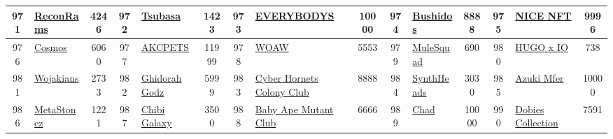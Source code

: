 \begin{table*}[]
{\begin{tabular}{|c|l|c|c|l|c|c|l|c|c|l|c|c|l|c|}
        971   & \href{https://www.reconrams.io/}{ReconRams}                                        & 4246              & 972   & \href{https://www.tabinekokiki.com/}{Tsubasa}                                                     & 1423              & 973   & \href{https://www.everybodys.io/}{EVERYBODYS}                                     & 10000             & 974   & \href{https://linktr.ee/bushidosnft}{Bushidos}                                & 8888              & 975   & \href{https://www.nice.club/}{NICE NFT}                                                   & 9996                                    \\ \hline
        976   & \href{https://cosmoskidznft.com}{Cosmos}                                           & 6060              & 977   & \href{https://opensea.io/collection/akcp}{AKCPETS}                                                & 11999             & 978   & \href{https://woawnft.xyz/}{WOAW}                                                 & 5553              & 979   & \href{http://TheMulesquad.com}{MuleSquad}                                     & 690               & 980   & \href{https://imaginaryones.com/hugo}{HUGO x IO}                                          & 738                                     \\ \hline
        981   & \href{http://woj.finance}{Wojakians}                                               & 2733              & 982   & \href{https://ghidorahgodz.com/}{Ghidorah Godz}                                                   & 5999              & 983   & \href{https://www.cyberhornetscolony.com/}{Cyber Hornets Colony Club}             & 8888              & 984   & \href{http://www.synthheads.com}{SynthHeads}                                  & 3030              & 985   & \href{https://www.azukimfers.art/}{Azuki Mfer}                                            & 10000                                   \\ \hline
        986   & \href{http://metastonez.io}{MetaStonez}                                            & 1221              & 987   & \href{https://chibilabs.io}{Chibi Galaxy}                                                         & 3500              & 988   & \href{https://opensea.io/collection/baby-ape-mutant-club}{Baby Ape Mutant Club}   & 6666              & 989   & \href{https://chadsnft.com}{Chad}                                             & 10000             & 990   & \href{https://opensea.io/collection/dobies-collection}{Dobies Collection}                 & 7591                                    \\ \hline

\end{tabular}}
\end{table*}
